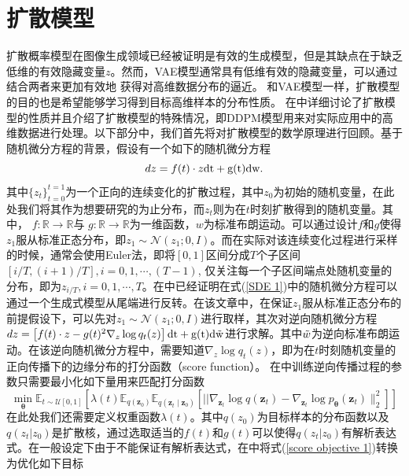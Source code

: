 \section{扩散模型}
扩散概率模型在图像生成领域已经被证明是有效的生成模型，但是其缺点在于缺乏低维的有效隐藏变量$z$。然而，VAE模型通常具有低维有效的隐藏变量，可以通过结合两者来更加有效地
获得对高维数据分布的逼近。
和VAE模型一样，扩散模型的目的也是希望能够学习得到目标高维样本的分布性质。 在\cite{diffusion}中详细讨论了扩散模型的性质并且介绍了扩散模型的特殊情况，即DDPM模型用来对实际应用中的高维数据进行处理。以下部分中，我们首先将对扩散模型的数学原理进行回顾。基于随机微分方程的背景，假设有一个如下的随机微分方程
\begin{equation}
    dz = f(t)\cdot z \rm{dt}+g(t)\rm{dw}.
    \label{SDE 1}
\end{equation}
其中$\{z_t\}_{t=0}^{t=1}$为一个正向的连续变化的扩散过程，其中$z_0$为初始的随机变量，在此处我们将其作为想要研究的为止分布，而$z_t$则为在$t$时刻扩散得到的随机变量。其中， $f: \mathbb{R}\rightarrow \mathbb{R}$与
 $g: \mathbb{R}\rightarrow \mathbb{R}$为一维函数，$w$为标准布朗运动。可以通过设计$f$和$g$使得$z_1$服从标准正态分布，即$z_1\sim \mathcal{N}(z_1;0,I)$。而在实际对该连续变化过程进行采样的时候，通常会使用Euler法，即将$[0,1]$区间分成$T$个子区间$[i/T,(i+1)/T], i =0,1,\cdots, (T-1)$, 仅关注每一个子区间端点处随机变量的分布，即为$z_{i/T},i=0,1,\cdots,T$。在\cite{diffusion}中已经证明在式(\ref{SDE 1})中的随机微分方程可以通过一个生成式模型从尾端进行反转。在该文章中，在保证$z_1$服从标准正态分布的前提假设下，可以先对$z_1\sim \mathcal{N}(z_1;0,I)$进行取样，其次对逆向随机微分方程 $dz = \left[f(t)\cdot z -g(t)^2 \nabla_z \log q_t(z)\right] \rm{dt} + g(t)d \Tilde{w}$进行求解。其中$\Tilde{w}$为逆向标准布朗运动。在该逆向随机微分方程中，需要知道$\nabla_z \log q_t(z)$，即为在$t$时刻随机变量的正向传播下的边缘分布的打分函数（score function）。
 在\cite{diffusion}中训练逆向传播过程的参数只需要最小化如下量用来匹配打分函数
\begin{equation}
    \min _{\boldsymbol{\theta}} \mathbb{E}_{t \sim \mathcal{U}[0,1]}\left[\lambda(t) \mathbb{E}_{q\left(\mathbf{z}_0\right)} \mathbb{E}_{q\left(\mathbf{z}_t \mid \mathbf{z}_0\right)}\left[|| \nabla_{\mathbf{z}_t} \log q\left(\mathbf{z}_t\right)-\nabla_{\mathbf{z}_t} \log p_{\boldsymbol{\theta}}\left(\mathbf{z}_t\right) \|_2^2\right]\right]
    \label{score objective 1}
\end{equation}
在此处我们还需要定义权重函数$\lambda(t)$。其中$q(z_0)$为目标样本的分布函数以及$q(z_t|z_0)$是扩散核，通过选取适当的$f(t)$和$g(t)$可以使得$q(z_t|z_0)$有解析表达式。在一般设定下由于不能保证有解析表达式，在\cite{diffusion}中将式(\ref{score objective 1})转换为优化如下目标
